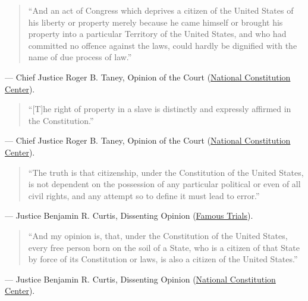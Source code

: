 \documentclass[12pt]{article}
\begin{document}
\begin{quote}
``And an act of Congress which deprives a citizen of the United States of his liberty or property merely because he came himself or brought his property into a particular Territory of the United States, and who had committed no offence against the laws, could hardly be dignified with the name of due process of law.''
\end{quote}
\noindent --- Chief Justice Roger B. Taney, Opinion of the Court (\href{https://constitutioncenter.org/the-constitution/supreme-court-case-library/dred-scott-v-sandford}{National Constitution Center}).

\begin{quote}
``[T]he right of property in a slave is distinctly and expressly affirmed in the Constitution.''
\end{quote}
\noindent --- Chief Justice Roger B. Taney, Opinion of the Court (\href{https://constitutioncenter.org/the-constitution/supreme-court-case-library/dred-scott-v-sandford}{National Constitution Center}).

\begin{quote}
``The truth is that citizenship, under the Constitution of the United States, is not dependent on the possession of any particular political or even of all civil rights, and any attempt so to define it must lead to error.''
\end{quote}
\noindent --- Justice Benjamin R. Curtis, Dissenting Opinion (\href{https://famous-trials.com/dredscott/2545-scott-v-sandford-the-dissent}{Famous Trials}).

\begin{quote}
``And my opinion is, that, under the Constitution of the United States, every free person born on the soil of a State, who is a citizen of that State by force of its Constitution or laws, is also a citizen of the United States.''
\end{quote}
\noindent --- Justice Benjamin R. Curtis, Dissenting Opinion (\href{https://constitutioncenter.org/the-constitution/supreme-court-case-library/dred-scott-v-sandford}{National Constitution Center}).
\end{document}

